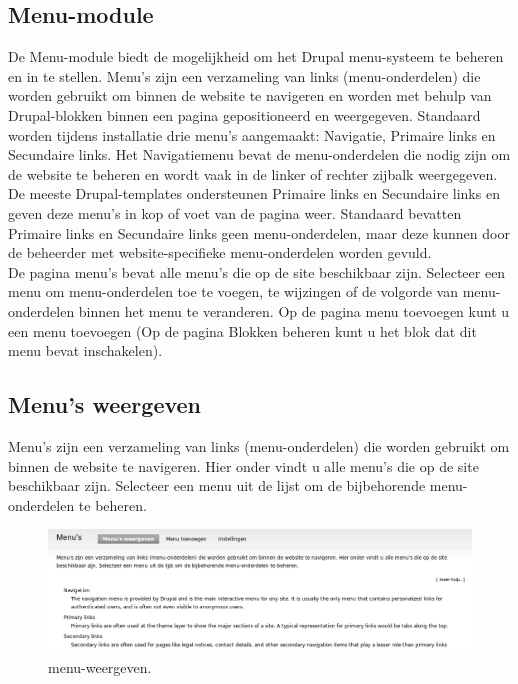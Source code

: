 \subsection{Menu-module} 
De Menu-module biedt de mogelijkheid om het Drupal menu-systeem te beheren en in te stellen. 
Menu's zijn een verzameling van links (menu-onderdelen) die worden gebruikt om binnen de 
website te navigeren en worden met behulp van Drupal-blokken binnen een pagina gepositioneerd 
en weergegeven. Standaard worden tijdens installatie drie menu's aangemaakt: Navigatie, Primaire links en Secundaire links. 
Het Navigatiemenu bevat de menu-onderdelen die nodig zijn om de website te beheren en wordt vaak in de linker of rechter 
zijbalk weergegeven. De meeste Drupal-templates ondersteunen Primaire links en Secundaire links en geven deze menu's in 
kop of voet van de pagina weer. Standaard bevatten Primaire links en Secundaire links geen menu-onderdelen, maar deze 
kunnen door de beheerder met website-specifieke menu-onderdelen worden gevuld.
\\
De pagina menu's bevat alle menu's die op de site beschikbaar zijn. Selecteer een menu om menu-onderdelen toe 
te voegen, te wijzingen of de volgorde van menu-onderdelen binnen het menu te veranderen. Op de pagina menu 
toevoegen kunt u een menu toevoegen (Op de pagina Blokken beheren kunt u het blok dat dit menu bevat inschakelen).

\subsection{Menu's weergeven}
Menu's zijn een verzameling van links (menu-onderdelen) die worden gebruikt om
binnen de website te navigeren. Hier onder vindt u alle menu's die op de site beschikbaar zijn. 
Selecteer een menu uit de lijst om de bijbehorende menu-onderdelen te beheren.
\begin{figure}[!h]
    \centering
   \includegraphics[scale=0.3,angle=0]{menu-weergeven}
   \caption{menu-weergeven.\label{white}}
 \end{figure}

